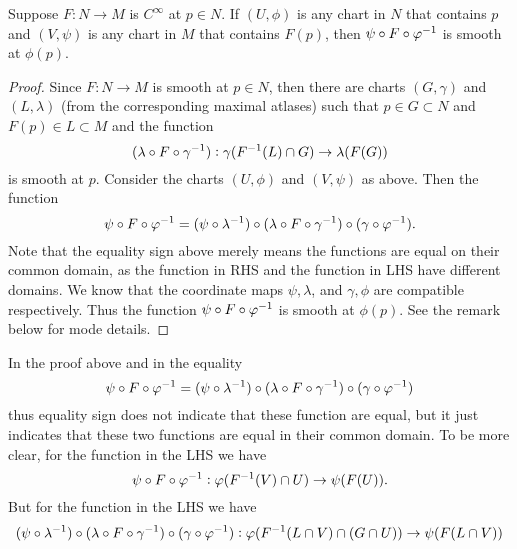 \begin{proposition}
	\label{prop:SmoothnessWellDefined}
	Suppose $ F: N \to M $ is $ C^\infty $ at $ p \in N $. If $ (U,\phi) $ is any chart in $ N $ that contains $ p $ and $ (V,\psi) $ is any chart in $ M $ that contains $ F(p) $, then $ \psi \circ F \circ \varphi^{-1} $ is smooth at $ \phi(p) $.
\end{proposition}

\begin{proof}
	Since $ F: N \to M $ is smooth at $ p \in N $, then there are charts $ (G,\gamma) $ and $ (L, \lambda) $ (from the corresponding maximal atlases) such that $ p \in G \subset N $ and $ F(p) \in L \subset M $ and the function 
	\[ (\lambda \circ F \circ \gamma^{-1}): \gamma(F^{-1}(L) \cap G ) \to \lambda(F(G)) \]
	is smooth at $ p $. Consider the charts $ (U,\phi) $ and $ (V,\psi) $ as above. Then the function
	\[ \psi \circ F \circ \varphi^{-1} = (\psi \circ \lambda^{-1})\circ(\lambda\circ F \circ \gamma^{-1})\circ(\gamma\circ \varphi^{-1}). \]
	Note that the equality sign above merely means the functions are equal on their common domain, as the function in RHS and the function in LHS have different domains. We know that the coordinate maps $ \psi, \lambda $, and $ \gamma, \phi$ are compatible respectively. Thus the function $ \psi \circ F \circ \varphi^{-1} $ is smooth at $ \phi(p) $. See the remark below for mode details.
\end{proof}

\begin{remark}
	In the proof above and in the equality 
	\[ \psi \circ F \circ \varphi^{-1} = (\psi \circ \lambda^{-1})\circ(\lambda\circ F \circ \gamma^{-1})\circ(\gamma\circ \varphi^{-1}) \]
	thus equality sign does not indicate that these function are equal, but it just indicates that these two functions are equal in their common domain. To be more clear, for the function in the LHS we have
	\[ \psi \circ F \circ \varphi^{-1} : \varphi(F^{-1}(V)\cap U) \to \psi(F(U)). \]
	But for the function in the LHS we have
	\[ (\psi \circ \lambda^{-1})\circ(\lambda\circ F \circ \gamma^{-1})\circ(\gamma\circ \varphi^{-1}):
	\varphi(F^{-1}(L\cap V) \cap (G\cap U)) \to \psi(F(L\cap V))
	 \]
\end{remark}

